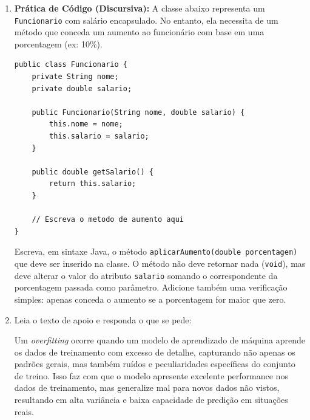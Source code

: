 \documentclass[12pt,a4paper]{article}
\newcommand{\resposta}[1]{
\noindent
\framebox[\textwidth]{
\begin{minipage}{0.98\textwidth}
\vspace{#1}
\end{minipage}
}
}
\begin{document}
\begin{enumerate}
    \begin{enumerate}[label=\Alph*)]
        \item V - V - V - F.
        \item F - V - V - V.
        \item V - F - V - V.
        \item F - F - V - V.
        \item F - V - F - V.
    \end{enumerate}

    \vspace{0.3cm}

    \item \textbf{Prática de Código (Discursiva):} A classe abaixo representa um \texttt{Funcionario} com salário encapsulado. No entanto, ela necessita de um método que conceda um aumento ao funcionário com base em uma porcentagem (ex: 10\%).  

\begin{lstlisting}
public class Funcionario {
    private String nome;
    private double salario;

    public Funcionario(String nome, double salario) {
        this.nome = nome;
        this.salario = salario;
    }

    public double getSalario() {
        return this.salario;
    }
    
    // Escreva o metodo de aumento aqui
}
\end{lstlisting}

    Escreva, em sintaxe Java, o método \texttt{aplicarAumento(double porcentagem)} que deve ser inserido na classe. O método não deve retornar nada (\texttt{void}), mas deve alterar o valor do atributo \texttt{salario} somando o correspondente da porcentagem passada como parâmetro. Adicione também uma verificação simples: apenas conceda o aumento se a porcentagem for maior que zero.

    \resposta{8cm}



\vspace{0.8cm}


\item Leia o texto de apoio e responda o que se pede:

Um \textit{overfitting} ocorre quando um modelo de aprendizado de máquina aprende os dados de treinamento com excesso de detalhe, capturando não apenas os padrões gerais, mas também ruídos e peculiaridades específicas do conjunto de treino. Isso faz com que o modelo apresente excelente performance nos dados de treinamento, mas generalize mal para novos dados não vistos, resultando em alta variância e baixa capacidade de predição em situações reais.


\end{enumerate}
\end{document}
